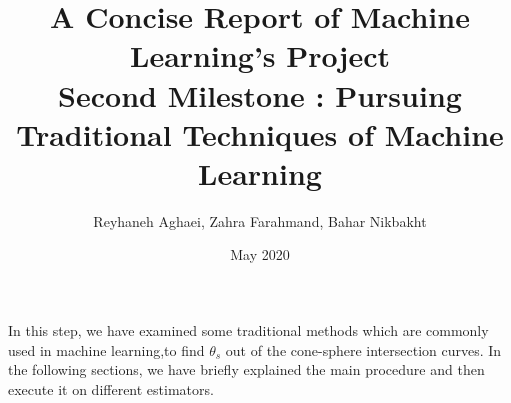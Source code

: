 \documentclass[a4paper,12pt]{article}
\begin{document}
\title{%
A Concise Report of Machine Learning's Project \\
\large Second Milestone : Pursuing Traditional Techniques of Machine Learning \\
}
\author{Reyhaneh Aghaei, Zahra Farahmand, Bahar Nikbakht}
\date{May 2020}

\maketitle

In this step, we have examined some traditional methods which are commonly used in machine learning,to find $\theta_s$ out of the cone-sphere intersection curves. In the following sections, we have briefly explained the main procedure and then execute it on different estimators.
\end{document}

